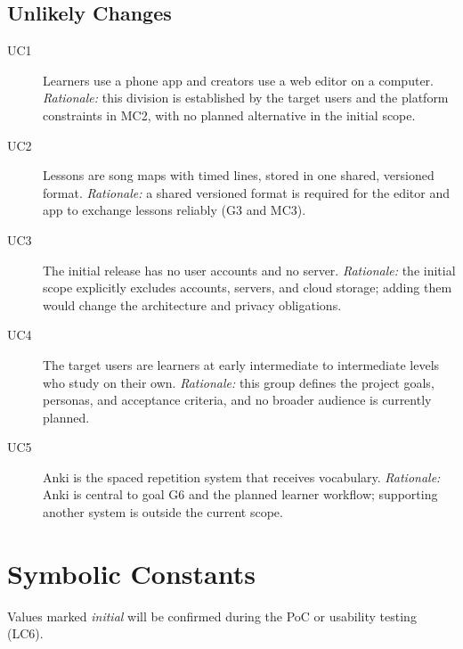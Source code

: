 \documentclass[12pt]{article}
\begin{document}
\subsection{Unlikely Changes}
\begin{description}
\item[UC1] Learners use a phone app and creators use a web editor on a
computer.
\emph{Rationale:} this division is established by the target users and the
platform constraints in MC2, with no planned alternative in the initial scope.
\item[UC2] Lessons are song maps with timed lines, stored in one shared,
versioned format.
\emph{Rationale:} a shared versioned format is required for the editor and app
to exchange lessons reliably (G3 and MC3).
\item[UC3] The initial release has no user accounts and no server.
\emph{Rationale:} the initial scope explicitly excludes accounts, servers, and
cloud storage; adding them would change the architecture and privacy obligations.
\item[UC4] The target users are learners at early intermediate to intermediate levels who study on their own.
\emph{Rationale:} this group defines the project goals, personas, and acceptance
criteria, and no broader audience is currently planned.
\item[UC5] Anki is the spaced repetition system that receives vocabulary.
\emph{Rationale:} Anki is central to goal G6 and the planned learner workflow;
supporting another system is outside the current scope.
\end{description}

\appendix

\section{Symbolic Constants} \label{SecConstants}
Values marked \emph{initial} will be confirmed during the PoC or usability
testing (LC6).
\end{document}

